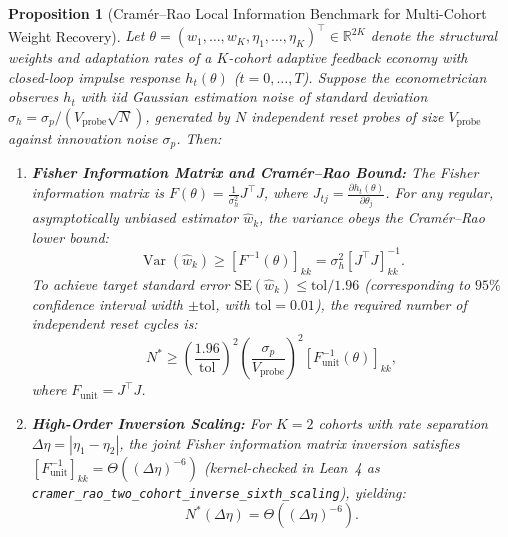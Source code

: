 \documentclass[12pt]{article}
\newtheorem{proposition}[theorem]{Proposition}
\theoremstyle{definition}
\theoremstyle{remark}
\begin{document}
\begin{proposition}[Cram\'er--Rao Local Information Benchmark for Multi-Cohort Weight Recovery]
\label{prop:ia_cohort_information}
Let $\theta = (w_1, \dots, w_K, \eta_1, \dots, \eta_K)^\top \in \mathbb{R}^{2K}$ denote the structural weights and adaptation rates of a $K$-cohort adaptive feedback economy with closed-loop impulse response $h_t(\theta)$ ($t=0, \dots, T$). Suppose the econometrician observes $h_t$ with iid Gaussian estimation noise of standard deviation $\sigma_h = \sigma_p / (V_{\mathrm{probe}} \sqrt{N})$, generated by $N$ independent reset probes of size $V_{\mathrm{probe}}$ against innovation noise $\sigma_p$. Then:
\begin{enumerate}
\item \textbf{Fisher Information Matrix and Cram\'er--Rao Bound:} The Fisher information matrix is $F(\theta) = \frac{1}{\sigma_h^2} J^\top J$, where $J_{tj} = \frac{\partial h_t(\theta)}{\partial \theta_j}$. For any regular, asymptotically unbiased estimator $\hat{w}_k$, the variance obeys the Cram\'er--Rao lower bound:
\begin{equation}
\operatorname{Var}(\hat{w}_k) \ge [F^{-1}(\theta)]_{kk} = \sigma_h^2 [J^\top J]^{-1}_{kk}.
\end{equation}
To achieve target standard error $\mathrm{SE}(\hat{w}_k) \le \mathrm{tol} / 1.96$ (corresponding to $95\%$ confidence interval width $\pm \mathrm{tol}$, with $\mathrm{tol} = 0.01$), the required number of independent reset cycles is:
\begin{equation}
N^* \ge \left( \frac{1.96}{\mathrm{tol}} \right)^2 \left( \frac{\sigma_p}{V_{\mathrm{probe}}} \right)^2 [F_{\mathrm{unit}}^{-1}(\theta)]_{kk},
\end{equation}
where $F_{\mathrm{unit}} = J^\top J$.
\item \textbf{High-Order Inversion Scaling:} For $K=2$ cohorts with rate separation $\Delta\eta = |\eta_1 - \eta_2|$, the joint Fisher information matrix inversion satisfies $[F_{\mathrm{unit}}^{-1}]_{kk} = \Theta((\Delta\eta)^{-6})$ (kernel-checked in Lean~4 as \nolinkurl{cramer_rao_two_cohort_inverse_sixth_scaling}), yielding:
\begin{equation}
N^*(\Delta\eta) = \Theta\left( (\Delta\eta)^{-6} \right).
\end{equation}

\end{enumerate}
\end{proposition}
\end{document}
